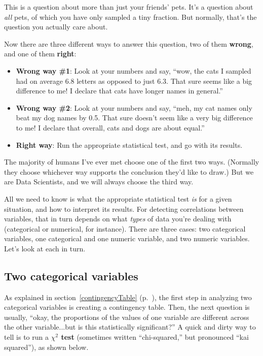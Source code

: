 This is a question about more than just your friends' pets. It's a question
about \textit{all} pets, of which you have only sampled a tiny fraction. But
normally, that's the question you actually care about.

Now there are three different ways to answer this question, two of them
\textbf{wrong}, and one of them \textbf{right}:

\begin{itemize}
\itemsep.1em
\item \textbf{Wrong way \#1}: Look at your numbers and say, ``wow, the cats I
sampled had on average 6.8 letters as opposed to just 6.3. That sure seems like
a big difference to me! I declare that cats have longer names in general.''
\item \textbf{Wrong way \#2}: Look at your numbers and say, ``meh, my cat names
only beat my dog names by 0.5. That sure doesn't seem like a very big
difference to me! I declare that overall, cats and dogs are about equal.''
\item \textbf{Right way}: Run the appropriate statistical test, and go with its
results.
\end{itemize}

The majority of humans I've ever met choose one of the first two ways.
(Normally they choose whichever way supports the conclusion they'd like to
draw.) But we are Data Scientists, and we will always choose the third way. 

All we need to know is what the appropriate statistical test \textit{is} for a
given situation, and how to interpret its results. For detecting correlations
between variables, that in turn depends on what \textit{types} of data you're
dealing with (categorical or numerical, for instance). There are three cases:
two categorical variables, one categorical and one numeric variable, and two
numeric variables. Let's look at each in turn.


\subsection{Two categorical variables}

As explained in section~\ref{contingencyTable} (p.~\pageref{contingencyTable}),
the first step in analyzing two categorical variables is creating a contingency
table. Then, the next question is usually, ``okay, the proportions of the
values of one variable are different across the other variable...but is this
statistically significant?'' A quick and dirty way to tell is to run a
\textbf{$\chi ^2$ test} (sometimes written ``chi-squared,'' but pronounced
``kai squared''), as shown below.


